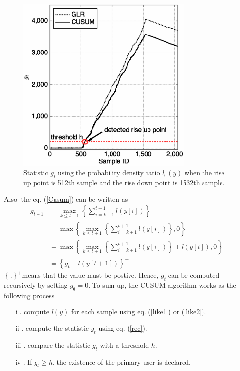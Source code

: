 \begin{figure}[t]
\centering
\includegraphics[width=87mm]{OFF2ON.eps}
\caption{ Statistic $g_t$ using the probability density ratio $l_0(y)$  when the rise up point is 512th sample and the rise down point is 1532th sample.}
\label{OFF2ON}
\end{figure}

Also, the eq. (\ref{Cusum}) can be written as
\begin{align}
g_{t+1} &= \max_{k \leq t+1}\left\{\sum_{i=k+1}^{t+1}l(y[i])\right\} \nonumber \\ 
&= \max\left\{\max_{k \leq t+1}\left\{\sum_{i=k+1}^{t+1}l(y[i])\right\},0\right\} \nonumber \\
&= \max\left\{\max_{k \leq t+1}\left\{\sum_{i=k+1}^{t+1}l(y[i])\right\}+l(y[i]),0\right\} \nonumber \\
&= \left\{g_t+l(y[t+1])\right\}^{+}.
\label{rec}
\end{align}
$\left\{.\right\}^{+}$means that the value must be postive. Hence, $g_t$ can be computed recursively by setting $g_0=0$. To sum up, the CUSUM algorithm works as the following process:
\begin{enumerate}
  \item[i]. compute $l(y)$ for each sample using eq. (\ref{like1}) or (\ref{like2}).
  \item[ii]. compute the statistic $g_t$ using eq. (\ref{rec}).
  \item[iii]. compare the statistic $g_t$ with a threshold $h$.
  \item[iv]. If $g_t \geq h$, the existence of the primary user is declared.
\end{enumerate}

